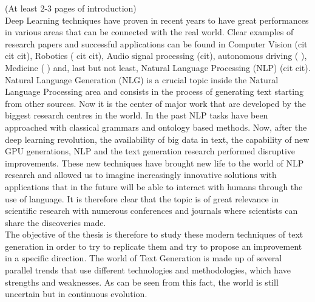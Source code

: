(At least 2-3 pages of introduction) \\

Deep Learning techniques have proven in recent years to have great performances in various areas that can be connected with the real world. Clear examples of research papers and successful applications can be found in Computer Vision (cit cit cit), Robotics (\cite{Lillicrap} cit cit), Audio signal processing (cit), autonomous driving (\cite{ChenAutonomousDriving} \cite{AutonomousDriving2}), Medicine (\cite{Medicine} ) and, last but not least, Natural Language Processing (NLP) (cit cit). \\
Natural Language Generation (NLG) is a crucial topic inside the Natural Language Processing area and consists in the process of generating text starting from other sources. Now it is the center of major work that are developed by the biggest research centres in the world. In the past NLP tasks have been approached with classical grammars and ontology based methods. Now, after the deep learning revolution, the availability of big data in text, the capability of new GPU generations, NLP and the text generation research performed disruptive improvements. These new techniques have brought new life to the world of NLP research and allowed us to imagine increasingly innovative solutions with applications that in the future will be able to interact with humans through the use of language. 
It is therefore clear that the topic is of great relevance in scientific research with numerous conferences and journals where scientists can share the discoveries made. \\
The objective of the thesis is therefore to study these modern techniques of text generation in order to try to replicate them and try to propose an improvement in a specific direction. The world of Text Generation is made up of several parallel trends that use different technologies and methodologies, which have strengths and weaknesses. As can be seen from this fact, the world is still uncertain but in continuous evolution.

